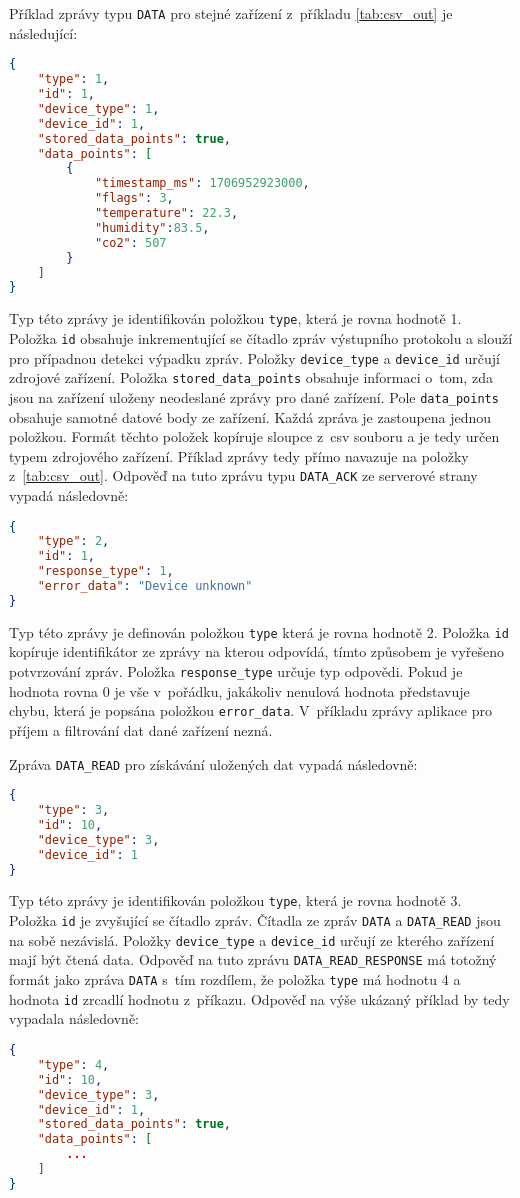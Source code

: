 Příklad zprávy typu \texttt{DATA} pro stejné zařízení z~příkladu \ref{tab:csv_out} je následující:
\begin{lstlisting}[language=json]
{
    "type": 1,
    "id": 1,
    "device_type": 1,
    "device_id": 1,
    "stored_data_points": true,
    "data_points": [
        {
            "timestamp_ms": 1706952923000,
            "flags": 3,
            "temperature": 22.3,
            "humidity":83.5,
            "co2": 507
        }
    ]
}
\end{lstlisting}
Typ této zprávy je identifikován položkou \texttt{type}, která je rovna hodnotě 1. Položka \texttt{id} obsahuje inkrementující se čítadlo zpráv výstupního protokolu a slouží pro případnou detekci výpadku zpráv. Položky \texttt{device\_type} a \texttt{device\_id} určují zdrojové zařízení. Položka \texttt{stored\_data\_points} obsahuje informaci o~tom, zda jsou na zařízení uloženy neodeslané zprávy pro dané zařízení. Pole \texttt{data\_points} obsahuje samotné datové body ze zařízení. Každá zpráva je zastoupena jednou položkou. Formát těchto položek kopíruje sloupce z~csv souboru a je tedy určen typem zdrojového zařízení. Příklad zprávy tedy přímo navazuje na položky z~\ref{tab:csv_out}. Odpověď na tuto zprávu typu \texttt{DATA\_ACK} ze serverové strany vypadá následovně:
\begin{lstlisting}[language=json]
{
    "type": 2,
    "id": 1,
    "response_type": 1,
    "error_data": "Device unknown"
}
\end{lstlisting}
Typ této zprávy je definován položkou \texttt{type} která je rovna hodnotě 2. Položka \texttt{id} kopíruje identifikátor ze zprávy na kterou odpovídá, tímto způsobem je vyřešeno potvrzování zpráv. Položka \texttt{response\_type} určuje typ odpovědi. Pokud je hodnota rovna 0 je vše v~pořádku, jakákoliv nenulová hodnota představuje chybu, která je popsána položkou \texttt{error\_data}. V~příkladu zprávy aplikace pro příjem a filtrování dat dané zařízení nezná.

Zpráva \texttt{DATA\_READ} pro získávání uložených dat vypadá následovně:
\begin{lstlisting}[language=json]
{
    "type": 3,
    "id": 10,
    "device_type": 3,
    "device_id": 1
}
\end{lstlisting}
Typ této zprávy je identifikován položkou \texttt{type}, která je rovna hodnotě 3. Položka \texttt{id} je zvyšující se čítadlo zpráv. Čítadla ze zpráv \texttt{DATA} a \texttt{DATA\_READ} jsou na sobě nezávislá. Položky \texttt{device\_type} a \texttt{device\_id} určují ze kterého zařízení mají být čtená data. Odpověď na tuto zprávu \texttt{DATA\_READ\_RESPONSE} má totožný formát jako zpráva \texttt{DATA} s~tím rozdílem, že položka \texttt{type} má hodnotu 4 a hodnota \texttt{id} zrcadlí hodnotu z~příkazu. Odpověď na výše ukázaný příklad by tedy vypadala následovně:
\begin{lstlisting}[language=json]
{
    "type": 4,
    "id": 10,
    "device_type": 3,
    "device_id": 1,
    "stored_data_points": true,
    "data_points": [
        ...
    ]
}
\end{lstlisting}

